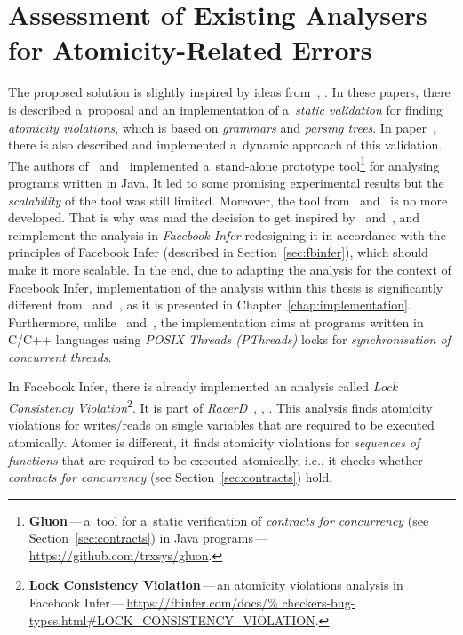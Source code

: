 \section{Assessment of Existing Analysers for Atomicity-Related Errors}
\label{sec:assessmentOfExistingAnalysers}

The proposed solution is slightly inspired by ideas from~\cite{contracts2017},
\cite{contracts2015}. In these papers, there is described a~proposal
and an implementation of a~\emph{static validation} for finding
\emph{atomicity violations}, which is based on \emph{grammars} and
\emph{parsing trees}. In paper~\cite{contracts2017}, there is also described
and implemented a~dynamic approach of this validation. The authors
of~\cite{contracts2017} and~\cite{contracts2015} implemented a~stand-alone
prototype tool\footnote{\textbf{Gluon}\,---\,a~tool for a~static verification of
\emph{contracts for concurrency} (see Section~\ref{sec:contracts}) in Java
programs\,---\,\url{https://github.com/trxsys/gluon}.} for analysing programs
written in Java. It led to some promising experimental results but the
\emph{scalability} of the tool was still limited. Moreover, the tool
from~\cite{contracts2017} and~\cite{contracts2015} is no more developed. That
is why was mad the decision to get inspired by~\cite{contracts2017}
and~\cite{contracts2015}, and reimplement the analysis in \emph{Facebook Infer}
redesigning it in accordance with the principles of Facebook Infer (described in
Section~\ref{sec:fbinfer}), which should make it more scalable. In the end, due
to adapting the analysis for the context of Facebook Infer, implementation of
the analysis within this thesis is significantly different
from~\cite{contracts2017} and~\cite{contracts2015}, as it is presented in
Chapter~\ref{chap:implementation}. Furthermore, unlike~\cite{contracts2017}
and~\cite{contracts2015}, the implementation aims at programs written
in C/C++ languages using \emph{POSIX Threads (PThreads)} locks for
\emph{synchronisation of concurrent threads}.

In Facebook Infer, there is already implemented an analysis called
\emph{Lock Consistency Violation}\footnote{\textbf{Lock Consistency
Violation}\,---\,an atomicity violations analysis in Facebook
Infer\,---\,\url{https://fbinfer.com/docs/%
checkers-bug-types.html\#LOCK_CONSISTENCY_VIOLATION}.}. It is part of
\emph{RacerD}~\cite{racerD}, \cite{racerDOnline},
\cite{staticRaceDetectorTruePositive}. This analysis finds atomicity
violations for writes/reads on single variables that are required to
be executed atomically. Atomer is different, it finds atomicity
violations for \emph{sequences of functions} that are required to be
executed atomically, i.e., it checks whether \emph{contracts for 
concurrency} (see Section~\ref{sec:contracts}) hold.


